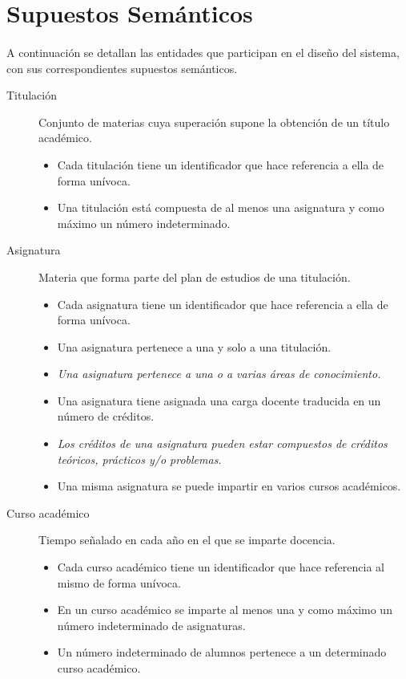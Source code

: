\section{Supuestos Semánticos}\label{supSem}

   \paragraph{}A continuación se detallan las entidades que participan en el
   diseño del sistema, con sus correspondientes supuestos semánticos.

   \begin{description}

      \item[Titulación] Conjunto de materias cuya superación supone la obtención
      de un título académico.
      \begin{itemize}
         \item Cada titulación tiene un identificador que hace referencia a ella
          de forma unívoca.
          \item Una titulación está compuesta de al menos una asignatura y como
         máximo un número indeterminado.
      \end{itemize}

      \item[Asignatura] Materia que forma parte del plan de estudios de una
      titulación.
      \begin{itemize}
         \item Cada asignatura tiene un identificador que hace referencia a ella
         de forma unívoca.
         \item Una asignatura pertenece a una y solo a una titulación.
         \item \textit{Una asignatura pertenece a una o a varias áreas de
         conocimiento.}
         \item Una asignatura tiene asignada una carga docente traducida en
         un número de créditos.
         \item \textit{Los créditos de una asignatura pueden estar compuestos de
         créditos teóricos, prácticos y/o problemas.}
         \item Una misma asignatura se puede impartir en varios cursos
         académicos.
      \end{itemize}

      \item[Curso académico] Tiempo señalado en cada año en el que se imparte
      docencia.
      \begin{itemize}
         \item Cada curso académico tiene un identificador que hace referencia
         al mismo de forma unívoca.
         \item En un curso académico se imparte al menos una y como máximo
         un número indeterminado de asignaturas.
         \item Un número indeterminado de alumnos pertenece a un determinado
         curso académico.
      \end{itemize}


\end{description}

